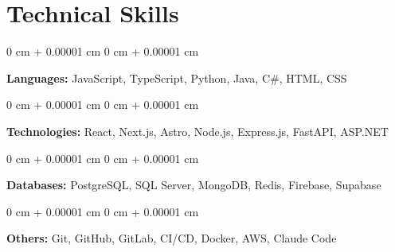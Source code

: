 \documentclass[10pt, letterpaper]{article}
\newenvironment{onecolentry}{
    \begin{adjustwidth}{
        0 cm + 0.00001 cm
    }{
        0 cm + 0.00001 cm
    }
}{
    \end{adjustwidth}
} %
\begin{document}
        \vspace{0.12 cm}

    
    \section{Technical Skills}



        
        \begin{onecolentry}
            \textbf{Languages:} JavaScript, TypeScript, Python, Java, C\#, HTML, CSS
        \end{onecolentry}

        \vspace{0.12 cm}

        \begin{onecolentry}
            \textbf{Technologies:} React, Next.js, Astro, Node.js, Express.js, FastAPI, ASP.NET
        \end{onecolentry}

        \vspace{0.12 cm}

        \begin{onecolentry}
            \textbf{Databases:} PostgreSQL, SQL Server, MongoDB, Redis, Firebase, Supabase
        \end{onecolentry}

        \vspace{0.12 cm}

        \begin{onecolentry}
            \textbf{Others:} Git, GitHub, GitLab, CI/CD, Docker, AWS, Claude Code
        \end{onecolentry}
    
\end{document}
